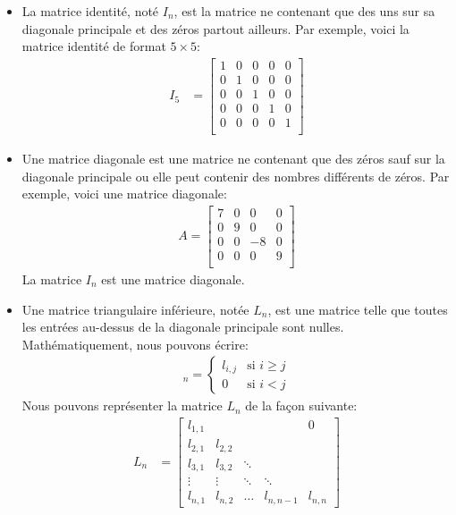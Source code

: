 \documentclass[]{book}
\providecommand{\tightlist}{%
  \setlength{\itemsep}{0pt}\setlength{\parskip}{0pt}}
\theoremstyle{definition}
\theoremstyle{definition}
\theoremstyle{definition}
\theoremstyle{remark}
\begin{document}
\begin{itemize}
\tightlist
\item
  La matrice identité, noté \(I_n\), est la matrice ne contenant que des uns sur sa diagonale principale et des zéros partout ailleurs. Par exemple, voici la matrice identité de format \(5 \times 5\):
  \begin{align*}
  I_5 &= \begin{bmatrix}
  1&0&0&0&0\\
  0&1&0&0&0\\
  0&0&1&0&0\\
  0&0&0&1&0\\
  0&0&0&0&1\\
  \end{bmatrix}
  \end{align*}
\item
  Une matrice diagonale est une matrice ne contenant que des zéros sauf sur la diagonale principale ou elle peut contenir des nombres différents de zéros. Par exemple, voici une matrice diagonale:
  \begin{align*}
  A = \begin{bmatrix}
  7&0&0&0\\
  0&9&0&0\\
  0&0&-8&0\\
  0&0&0&9\\
  \end{bmatrix}
  \end{align*}
  La matrice \(I_n\) est une matrice diagonale.
\item
  Une matrice triangulaire inférieure, notée \(L_n\), est une matrice telle que toutes les entrées au-dessus de la diagonale principale sont nulles. Mathématiquement, nous pouvons écrire:
  \begin{align*}
  [l_{i,j}]_n = \begin{cases}
  l_{i,j} & \text{si } i \geq j \\
  0 & \text{si } i < j
  \end{cases} 
  \end{align*}
  Nous pouvons représenter la matrice \(L_n\) de la façon suivante:
  \begin{align*}
  L_n &= \begin{bmatrix}
  l_{1,1} & & & & 0 \\
  l_{2,1} & l_{2,2} & & & \\
  l_{3,1} & l_{3,2} & \ddots & & \\
  \vdots & \vdots & \ddots & \ddots & \\
  l_{n,1} & l_{n,2} & \ldots & l_{n,n-1} & l_{n,n} 

\end{bmatrix}
\end{align*}
\end{itemize}
\end{document}
